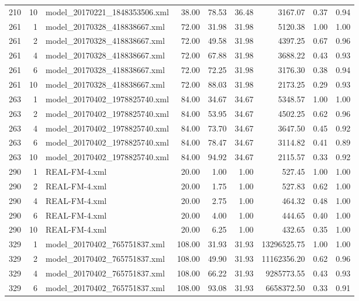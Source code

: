 \begin{table}[ht]
\begin{tabular}{rrlrrrrrr}
  210 &  10 & model\_20170221\_1848353506.xml & 38.00 & 78.53 & 36.48 & 3167.07 & 0.37 & 0.94 \\ 
  261 &   1 & model\_20170328\_418838667.xml & 72.00 & 31.98 & 31.98 & 5120.38 & 1.00 & 1.00 \\ 
  261 &   2 & model\_20170328\_418838667.xml & 72.00 & 49.58 & 31.98 & 4397.25 & 0.67 & 0.96 \\ 
  261 &   4 & model\_20170328\_418838667.xml & 72.00 & 67.88 & 31.98 & 3688.22 & 0.43 & 0.93 \\ 
  261 &   6 & model\_20170328\_418838667.xml & 72.00 & 72.25 & 31.98 & 3176.30 & 0.38 & 0.94 \\ 
  261 &  10 & model\_20170328\_418838667.xml & 72.00 & 88.03 & 31.98 & 2173.25 & 0.29 & 0.93 \\ 
  263 &   1 & model\_20170402\_1978825740.xml & 84.00 & 34.67 & 34.67 & 5348.57 & 1.00 & 1.00 \\ 
  263 &   2 & model\_20170402\_1978825740.xml & 84.00 & 53.95 & 34.67 & 4502.25 & 0.62 & 0.96 \\ 
  263 &   4 & model\_20170402\_1978825740.xml & 84.00 & 73.70 & 34.67 & 3647.50 & 0.45 & 0.92 \\ 
  263 &   6 & model\_20170402\_1978825740.xml & 84.00 & 78.47 & 34.67 & 3114.82 & 0.41 & 0.89 \\ 
  263 &  10 & model\_20170402\_1978825740.xml & 84.00 & 94.92 & 34.67 & 2115.57 & 0.33 & 0.92 \\ 
  290 &   1 & REAL-FM-4.xml & 20.00 & 1.00 & 1.00 & 527.45 & 1.00 & 1.00 \\ 
  290 &   2 & REAL-FM-4.xml & 20.00 & 1.75 & 1.00 & 527.83 & 0.62 & 1.00 \\ 
  290 &   4 & REAL-FM-4.xml & 20.00 & 2.75 & 1.00 & 464.32 & 0.48 & 1.00 \\ 
  290 &   6 & REAL-FM-4.xml & 20.00 & 4.00 & 1.00 & 444.65 & 0.40 & 1.00 \\ 
  290 &  10 & REAL-FM-4.xml & 20.00 & 6.25 & 1.00 & 432.65 & 0.35 & 1.00 \\ 
  329 &   1 & model\_20170402\_765751837.xml & 108.00 & 31.93 & 31.93 & 13296525.75 & 1.00 & 1.00 \\ 
  329 &   2 & model\_20170402\_765751837.xml & 108.00 & 49.90 & 31.93 & 11162356.20 & 0.62 & 0.96 \\ 
  329 &   4 & model\_20170402\_765751837.xml & 108.00 & 66.22 & 31.93 & 9285773.55 & 0.43 & 0.93 \\ 
  329 &   6 & model\_20170402\_765751837.xml & 108.00 & 93.08 & 31.93 & 6658372.50 & 0.33 & 0.91 \\ 

\end{tabular}
\end{table}
